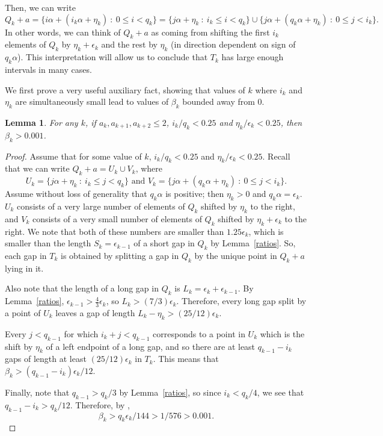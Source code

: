 \documentclass[11pt,reqno]{amsart}
\newtheorem{lemma}[theorem]{Lemma}
\theoremstyle{definition}
\theoremstyle{plain}
\begin{document}
Then, we can write
\[
Q_k + a = \{i\alpha + (i_k \alpha + \eta_k) \ : \ 0 \leq i < q_k\} = 
\{j \alpha + \eta_k \ : \ i_k \leq i < q_k\} \cup \{j \alpha + (q_k \alpha + \eta_k) \ : \ 0 \leq j < i_k\}.
\]
In other words, we can think of $Q_k + a$ as coming from shifting the first $i_k$ elements of $Q_k$ by $\eta_k + \epsilon_k$ and the rest by $\eta_k$ (in direction dependent on sign of $q_k \alpha$). This interpretation will allow us to conclude that $T_k$ has large enough intervals in many cases. %

We first prove a very useful auxiliary fact, showing that values of $k$ where $i_k$ and $\eta_k$ are simultaneously small lead to values of $\beta_k$ bounded away from $0$.

\begin{lemma}\label{smallboth}
For any $k$, if $a_k, a_{k+1}, a_{k+2} \leq 2$, $i_k/q_k < 0.25$ and $\eta_k/\epsilon_k < 0.25$, then $\beta_k > 0.001$.
\end{lemma}

\begin{proof}
Assume that for some value of $k$, $i_k/q_k < 0.25$ and $\eta_k/\epsilon_k < 0.25$. Recall that we can write
$Q_k + a = U_k \cup V_k$, where 
\begin{equation}\label{uv}
U_k = \{j \alpha + \eta_k \ : \ i_k \leq j < q_k\} \textrm{ and } V_k = \{j \alpha + (q_k \alpha + \eta_k) \ : \ 0 \leq j < i_k\}.
\end{equation}
Assume without loss of generality that $q_k \alpha$ is positive; then $\eta_k > 0$ and $q_k \alpha = \epsilon_k$. 
$U_k$ consists of a very large number of elements of $Q_k$ shifted by $\eta_k$ to the right, and $V_k$ consists of a very small number of elements of $Q_k$ shifted by $\eta_k + \epsilon_k$ to the right. We note that both of these numbers are smaller than 
$1.25\epsilon_k$, which is smaller than the length $S_k = \epsilon_{k-1}$ of a short gap in $Q_k$ by Lemma~\ref{ratios}. So, each gap in $T_k$ is obtained by splitting a gap in $Q_k$ by the unique point in $Q_k + a$ lying in it. 

Also note that the length of a long gap in $Q_k$ is $L_k = \epsilon_k + \epsilon_{k-1}$. By Lemma~\ref{ratios}, 
$\epsilon_{k-1} > \frac{4}{3} \epsilon_k$, so $L_k > (7/3) \epsilon_k$. Therefore, every long gap split by a point of $U_k$ leaves a gap of length $L_k - \eta_k > (25/12) \epsilon_k$. 

Every $j < q_{k-1}$ for which $i_k + j < q_{k-1}$ corresponds to a point in $U_k$ which is the shift by $\eta_k$ of a left endpoint of a long gap, and so there are at least $q_{k-1} - i_k$ gaps of length at least $(25/12) \epsilon_k$ in $T_k$. This means that $\beta_k > (q_{k-1} - i_k) \epsilon_k/12$.

Finally, note that $q_{k-1} > q_k/3$ by Lemma~\ref{ratios}, so since $i_k < q_k/4$, we see that
$q_{k-1} - i_k > q_k/12$. %
Therefore, by ,
\[
\beta_k > q_k \epsilon_k/144 > 1/576 > 0.001.
\]

\end{proof}
\end{document}
